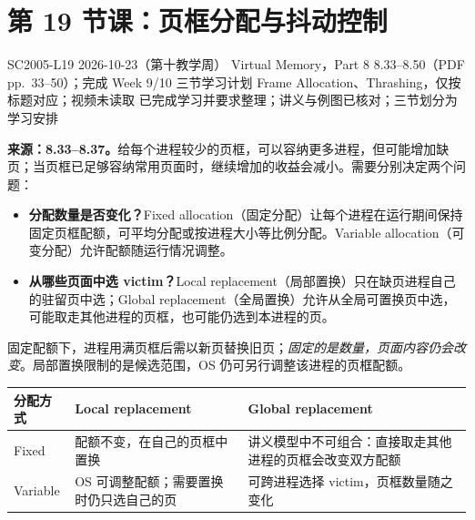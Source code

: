 \begingroup
\renewcommand{\recordid}[1]{}
\renewcommand{\relatedexercise}[2]{\hyperref[exercise:#1]{#2}}
\section{第 19 节课：页框分配与抖动控制}
\label{lecture:SC2005-L19}

\lecturemeta
  {SC2005-L19}
  {2026-10-23（第十教学周）}
  {Virtual Memory，Part 8}
  {8.33--8.50（PDF pp.~33--50）；完成 Week 9/10 三节学习计划}
  {Frame Allocation、Thrashing，仅按标题对应；视频未读取}
  {已完成学习并要求整理；讲义与例图已核对；三节划分为学习安排}

\linespread{1.15}\selectfont
\setlength{\parskip}{0.4em}



\textbf{来源：8.33--8.37。}给每个进程较少的页框，可以容纳更多进程，但可能增加缺页；当页框已足够容纳常用页面时，继续增加的收益会减小。需要分别决定两个问题：
\begin{itemize}
  \item \textbf{分配数量是否变化？}Fixed allocation（固定分配）让每个进程在运行期间保持固定页框配额，可平均分配或按进程大小等比例分配。Variable allocation（可变分配）允许配额随运行情况调整。
  \item \textbf{从哪些页面中选 victim？}Local replacement（局部置换）只在缺页进程自己的驻留页中选；Global replacement（全局置换）允许从全局可置换页中选，可能取走其他进程的页框，也可能仍选到本进程的页。
\end{itemize}

固定配额下，进程用满页框后需以新页替换旧页；\emph{固定的是数量，页面内容仍会改变}。局部置换限制的是候选范围，OS 仍可另行调整该进程的页框配额。

\begin{center}
\begin{tabularx}{\textwidth}{@{}l>{\raggedright\arraybackslash}X>{\raggedright\arraybackslash}X@{}}
\toprule
分配方式 & Local replacement & Global replacement \\
\midrule
Fixed & 配额不变，在自己的页框中置换 & 讲义模型中不可组合：直接取走其他进程的页框会改变双方配额 \\
Variable & OS 可调整配额；需要置换时仍只选自己的页 & 可跨进程选择 victim，页框数量随之变化 \\
\bottomrule
\end{tabularx}
\end{center}


